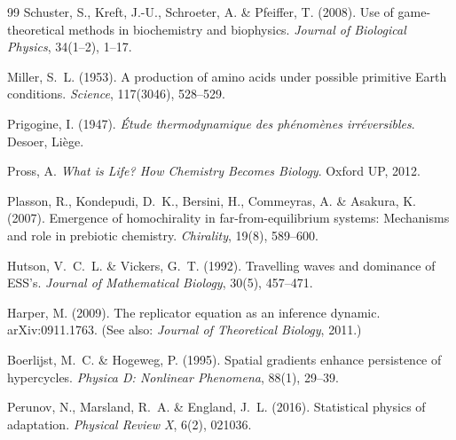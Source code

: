 \documentclass[12pt,a4paper]{article}
\theoremstyle{remark}
\begin{document}
\begin{thebibliography}{99}
Schuster, S., Kreft, J.-U., Schroeter, A. \& Pfeiffer, T. (2008).
\newblock Use of game-theoretical methods in biochemistry and biophysics.
\newblock \textit{Journal of Biological Physics}, 34(1--2), 1--17.

Miller, S.~L. (1953).
\newblock A production of amino acids under possible primitive Earth conditions.
\newblock \textit{Science}, 117(3046), 528--529.


Prigogine, I. (1947).
\newblock \textit{\'Etude thermodynamique des ph\'enom\`enes irr\'eversibles}.
\newblock Desoer, Li\`ege.

Pross, A.
\newblock \textit{What is Life? How Chemistry Becomes Biology}.
\newblock Oxford UP, 2012.

Plasson, R., Kondepudi, D.~K., Bersini, H., Commeyras, A. \& Asakura, K. (2007).
\newblock Emergence of homochirality in far-from-equilibrium systems: Mechanisms and role in prebiotic chemistry.
\newblock \textit{Chirality}, 19(8), 589--600.

Hutson, V.~C.~L. \& Vickers, G.~T. (1992).
\newblock Travelling waves and dominance of ESS's.
\newblock \textit{Journal of Mathematical Biology}, 30(5), 457--471.

Harper, M. (2009).
\newblock The replicator equation as an inference dynamic.
\newblock arXiv:0911.1763.
\newblock (See also: \textit{Journal of Theoretical Biology}, 2011.)

Boerlijst, M.~C. \& Hogeweg, P. (1995).
\newblock Spatial gradients enhance persistence of hypercycles.
\newblock \textit{Physica D: Nonlinear Phenomena}, 88(1), 29--39.


Perunov, N., Marsland, R.~A. \& England, J.~L. (2016).
\newblock Statistical physics of adaptation.
\newblock \textit{Physical Review X}, 6(2), 021036.


\end{thebibliography}
\end{document}
